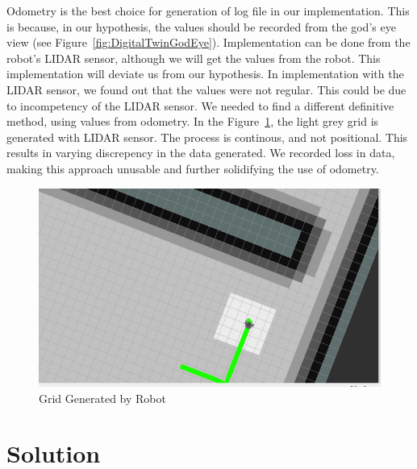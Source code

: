 Odometry is the best choice for generation of log file in our implementation. This is because, in our hypothesis, the values should be recorded from the god's eye view (see Figure~\ref{fig:DigitalTwinGodEye}).
Implementation can be done from the robot's LIDAR sensor, although we will get the values from the robot. This implementation will deviate us from our hypothesis. In implementation with the LIDAR sensor, we found out that
the values were not regular. This could be due to incompetency of the LIDAR sensor. We needed to find a different definitive method, using values from odometry. 
In the Figure~\ref{fig:LIDARSensorGrid}, the light grey grid is generated with LIDAR sensor. The process is continous, and not positional. This results in varying discrepency in the data generated. We recorded loss in data, making this approach unusable and further solidifying 
the use of odometry.

\begin{figure}[th]
    \centering
    \includegraphics[width=\textwidth]{Figures/local_costmap-grid.png}
    \decoRule
    \caption[]{Grid Generated by Robot}
    \label{fig:LIDARSensorGrid}
\end{figure}

\section{Solution}

